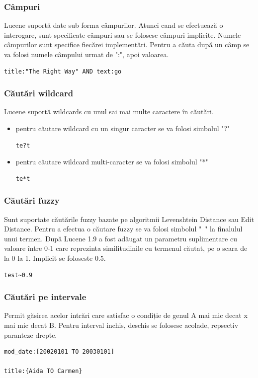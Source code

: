 \documentclass[12pt]{report}
\begin{document}
	\subsubsection{Câmpuri}
Lucene suportă date sub forma câmpurilor. Atunci cand se efectuează o interogare, sunt specificate câmpuri sau se folosesc câmpuri implicite. Numele câmpurilor sunt specifice fiecărei implementări. Pentru a căuta după un câmp se va folosi numele câmpului urmat de ":", apoi valoarea.
\begin{lstlisting}[caption={exemplu de căutare după câmpuri - Lucene query},captionpos=b]
title:"The Right Way" AND text:go
\end{lstlisting}

 	\subsubsection{Căutări wildcard}
Lucene suportă wildcards cu unul sai mai multe caractere în căutări.
\begin{itemize}
\item pentru căutare wildcard cu un singur caracter se va folosi simbolul "?"
\begin{lstlisting}[caption={căutare wildcard cu un singur caracter - Lucene query},captionpos=b]
te?t
\end{lstlisting}
\item pentru căutare wildcard multi-caracter se va folosi simbolul "*"
\begin{lstlisting}[caption={căutare wildcardmulti-caracter - Lucene query},captionpos=b]
te*t
\end{lstlisting}
\end{itemize}

	\subsubsection{Căutări fuzzy}
Sunt suportate căutările fuzzy bazate pe algoritmii Levenshtein Distance sau Edit Distance. Pentru a efectua o căutare fuzzy se va folosi simbolul "~" la finalulul unui termen. După Lucene 1.9 a fost adăugat un parametru suplimentare cu valoare între 0-1 care reprezinta similitudinile cu termenul căutat, pe o scara de la 0 la 1. Implicit se foloseste 0.5.
\begin{lstlisting}[caption={căutare fuzzy - Lucene query},captionpos=b]
test~0.9
\end{lstlisting}

	\subsubsection{Căutări pe intervale}
Permit găsirea acelor intrări care satisfac o condiție de genul A mai mic decat x mai mic decat B. Pentru interval inchis, deschis se folosesc acolade, repsectiv paranteze drepte.
\begin{lstlisting}[caption={căutari pe intervale - Lucene query},captionpos=b]
mod_date:[20020101 TO 20030101]

title:{Aida TO Carmen}
\end{lstlisting}
\end{document}
